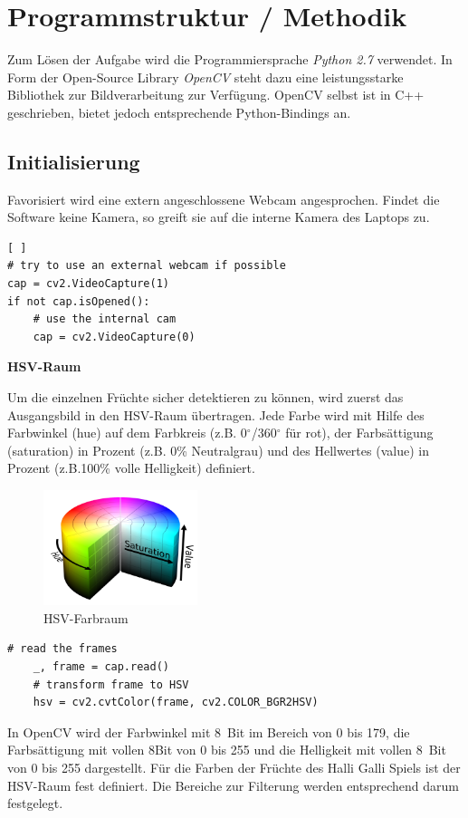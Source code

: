 
\section{Programmstruktur / Methodik}
\label{sec:Programmstruktur}

Zum Lösen der Aufgabe wird die Programmiersprache \emph{Python 2.7} verwendet. In Form der Open-Source Library \emph{OpenCV} steht dazu eine leistungsstarke Bibliothek zur Bildverarbeitung zur Verfügung.
OpenCV selbst ist in C++ geschrieben, bietet jedoch entsprechende Python-Bindings an.


\subsection{Initialisierung}

Favorisiert wird eine extern angeschlossene Webcam angesprochen. Findet die Software keine Kamera, so greift sie auf die interne Kamera des Laptops zu. 
\begin{singlespace}
\lstset{language=Python}
\begin{lstlisting}[ ]
# try to use an external webcam if possible
cap = cv2.VideoCapture(1)
if not cap.isOpened():
    # use the internal cam
    cap = cv2.VideoCapture(0)
\end{lstlisting}
\end{singlespace}

\textbf{HSV-Raum}

Um die einzelnen Früchte sicher detektieren zu können, wird zuerst das Ausgangsbild in den HSV-Raum übertragen. Jede Farbe wird mit Hilfe des Farbwinkel (hue) auf dem Farbkreis (z.B. 0$^\circ$/360$^\circ$  für rot), der Farbsättigung (saturation) in Prozent (z.B. 0\% Neutralgrau) und des Hellwertes (value) in Prozent (z.B.100\% volle Helligkeit) definiert.
\begin{figure}[H]
    \centering
    \includegraphics[width=0.4\textwidth]{Abbildungen/HSV_color}
    \caption[HSV]{HSV-Farbraum}
    \label{fig:HSV-Farbraum}
\end{figure}
\lstset{language=Python}
\begin{lstlisting}[]
    # read the frames
    _, frame = cap.read()
    # transform frame to HSV
    hsv = cv2.cvtColor(frame, cv2.COLOR_BGR2HSV)
\end{lstlisting}
In OpenCV wird der Farbwinkel mit 8~Bit im Bereich von 0 bis 179, die Farbsättigung mit vollen 8Bit von 0 bis 255 und die Helligkeit mit vollen 8~Bit von 0 bis 255 dargestellt.
Für die Farben der Früchte des Halli Galli Spiels ist der HSV-Raum fest definiert. Die Bereiche zur Filterung werden entsprechend darum festgelegt. 

